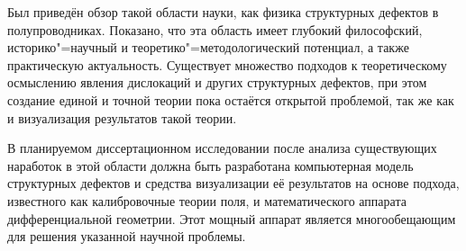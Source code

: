 \documentclass[a4paper, 14pt, titlepage]{extarticle}
\begin{document}

  Был приведён обзор такой области науки, как физика структурных дефектов в полупроводниках.
  Показано, что эта область имеет глубокий философский, историко"=научный и теоретико"=методологический
  потенциал, а также практическую актуальность. Существует множество подходов к теоретическому
  осмыслению явления дислокаций и других структурных дефектов, при этом создание единой и точной
  теории пока остаётся открытой проблемой, так же как и визуализация результатов такой теории.

  В планируемом диссертационном исследовании после анализа существующих наработок в этой области
  должна быть разработана компьютерная модель структурных дефектов и средства визуализации её
  результатов на основе подхода, известного как калибровочные теории поля, и математического
  аппарата дифференциальной геометрии. Этот мощный аппарат является многообещающим для решения
  указанной научной проблемы.

  \PrintBibliography
\end{document}
